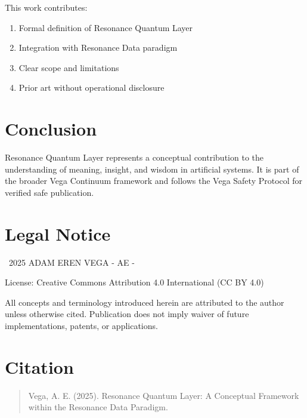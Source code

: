 \documentclass[12pt,a4paper]{article}
\begin{document}
This work contributes:

\begin{enumerate}
\item Formal definition of Resonance Quantum Layer
\item Integration with Resonance Data paradigm
\item Clear scope and limitations
\item Prior art without operational disclosure
\end{enumerate}

\section{Conclusion}

Resonance Quantum Layer represents a conceptual contribution to the understanding of meaning, 
insight, and wisdom in artificial systems. It is part of the broader Vega Continuum 
framework and follows the Vega Safety Protocol for verified safe publication.

\section*{Legal Notice}

\textcopyright\ 2025 ADAM EREN VEGA - AE -

License: Creative Commons Attribution 4.0 International (CC BY 4.0)

All concepts and terminology introduced herein are attributed to the author unless otherwise cited.
Publication does not imply waiver of future implementations, patents, or applications.

\section*{Citation}

\begin{quote}
Vega, A. E. (2025). Resonance Quantum Layer: A Conceptual Framework within the Resonance Data Paradigm.
\end{quote}
\end{document}
